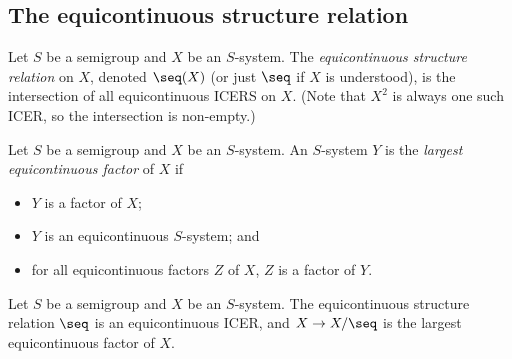 \subsection{The equicontinuous structure relation}

\begin{definition}
\label{def_equicontinuous_structure_relation}
\leanok{}
    Let $S$ be a semigroup and $X$ be an $S$-system.  The \emph{equicontinuous structure relation} on $X$, denoted $\seq(X)$ (or just $\seq$ if $X$ is understood), is the intersection of all equicontinuous ICERS on $X$.  (Note that $X^2$ is always one such ICER, so the intersection is non-empty.)
\end{definition}



\begin{definition}
    \label{def_largest_equi_factor}
    Let $S$ be a semigroup and $X$ be an $S$-system.  An $S$-system $Y$ is the \emph{largest equicontinuous factor} of $X$ if
    \begin{itemize}
        \item $Y$ is a factor of $X$;
        \item $Y$ is an equicontinuous $S$-system; and
        \item for all equicontinuous factors $Z$ of $X$, $Z$ is a factor of $Y$.
    \end{itemize}
\end{definition}

\begin{lemma}
\label{lemma_seq_is_equi_and_largest}
    Let $S$ be a semigroup and $X$ be an $S$-system.  The equicontinuous structure relation $\seq$ is an equicontinuous ICER, and $X \to X/\seq$ is the largest equicontinuous factor of $X$.
\end{lemma}

